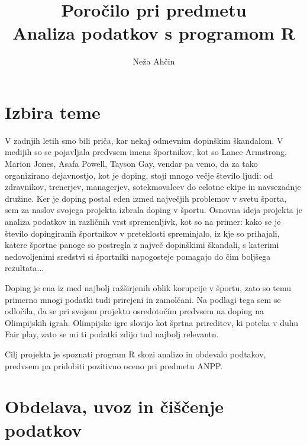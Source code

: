 \documentclass[11pt,a4paper]{article}
\begin{document}
\title{Poročilo pri predmetu \\
Analiza podatkov s programom R}
\author{Neža Ahčin}
\maketitle
\newpage
\section{Izbira teme}

V zadnjih letih smo bili priča, kar nekaj odmevnim dopinškim škandalom. V medijih so se pojavljala predvsem imena športnikov, kot so Lance Armstrong, Marion Jones, Asafa Powell, Tayson Gay, vendar pa vemo, da za tako organizirano dejavnostjo, kot je doping, stoji mnogo večje število ljudi: od zdravnikov, trenerjev, managerjev, sotekmovalcev do celotne ekipe in navsezadnje družine. Ker je doping postal eden izmed največjih problemov v svetu športa, sem za naslov svojega projekta izbrala doping v športu.
\newline
Osnovna ideja projekta je analiza podatkov in različnih vrst spremenljivk, kot so na primer: kako se je število dopingiranih športnikov v preteklosti spreminjalo, iz kje so prihajali, katere športne panoge so postregla z največ dopinškimi škandali, s katerimi nedovoljenimi sredstvi si športniki napogosteje pomagajo do čim boljšega rezultata...


Doping je ena iz med najbolj ražširjenih oblik korupcije v športu, zato so temu primerno mnogi podatki tudi prirejeni in zamolčani. Na podlagi tega sem se odločila, da se pri svojem projektu osredotočim predvsem na doping na Olimpijskih igrah. Olimpijske igre slovijo kot šprtna prireditev, ki poteka v duhu Fair play, zato se mi ti podatki zdijo tud najbolj relevantn.


Cilj projekta je spoznati program R skozi analizo in obdevalo podtakov, predvsem pa pridobiti pozitivno oceno pri predmetu ANPP.

\newpage

\section{Obdelava, uvoz in čiščenje podatkov}
\end{document}
